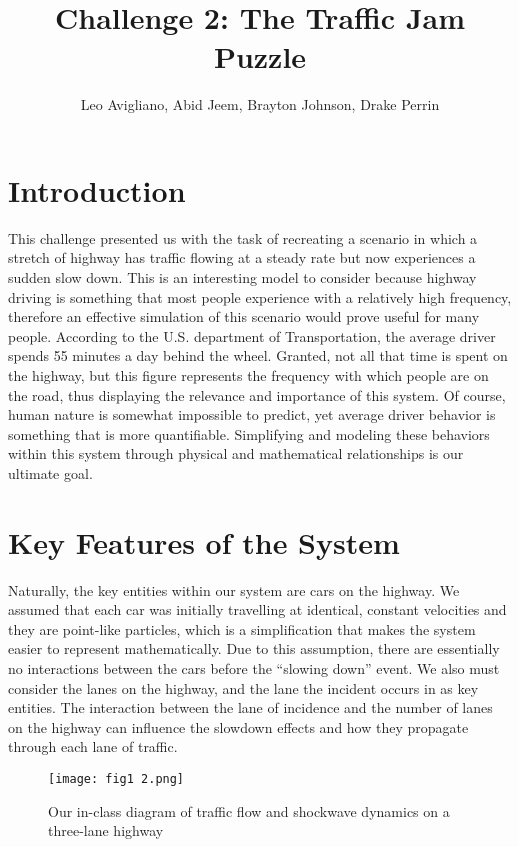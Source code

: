 \documentclass[10pt]{article}
\begin{document}
\title{Challenge 2: The Traffic Jam Puzzle}
\author{Leo Avigliano, Abid Jeem, Brayton Johnson, Drake Perrin}
\date{}
\maketitle

\section*{Introduction}
This challenge presented us with the task of recreating a scenario in which a stretch of highway has traffic flowing at a steady rate but now experiences a sudden slow down. This is an interesting model to consider because highway driving is something that most people experience with a relatively high frequency, therefore an effective simulation of this scenario would prove useful for many people. According to the U.S. department of Transportation, the average driver spends 55 minutes a day behind the wheel. Granted, not all that time is spent on the highway, but this figure represents the frequency with which people are on the road, thus displaying the relevance and importance of this system. Of course, human nature is somewhat impossible to predict, yet average driver behavior is something that is more quantifiable. Simplifying and modeling these behaviors within this system through physical and mathematical relationships is our ultimate goal.  

\section*{Key Features of the System}
Naturally, the key entities within our system are cars on the highway. We assumed that each car was initially travelling at identical, constant velocities and they are point-like particles, which is a simplification that makes the system easier to represent mathematically. Due to this assumption, there are essentially no interactions between the cars before the “slowing down” event. We also must consider the lanes on the highway, and the lane the incident occurs in as key entities. The interaction between the lane of incidence and the number of lanes on the highway can influence the slowdown effects and how they propagate through each lane of traffic.

\begin{figure}[h!]
    \centering
    \texttt{[image: fig1 2.png]}
    \caption{Our in-class diagram of traffic flow and shockwave dynamics on a three-lane highway}
    \label{fig:traffic_model}
\end{figure}
\end{document}
